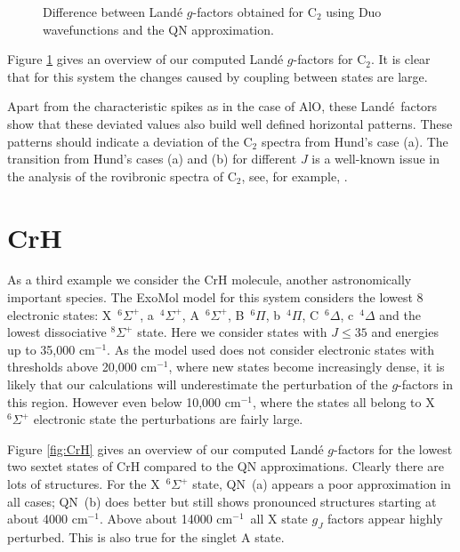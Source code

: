 \documentclass[preprint,review,12pt]{elsarticle}
\newcommand{\2}{$_{2}$}
\newcommand{\3}{$_{3}$}
\newcommand{\4}{$_{4}$}
\newcommand{\8}{$^{18}$}
\newcommand{\6}{$^{16}$}
\newcommand{\7}{$^{17}$}
\newcommand{\cm}{cm$^{-1}$}
\newcommand{\lande}{Land\'e}
\begin{document}
\begin{figure}[htbp]
		\centering
{}
\caption{Difference between Land\'e $g$-factors obtained for C$_2$ using {\sc Duo} wavefunctions and the QN
approximation.}
\label{fig:C2}
\end{figure}

	
Figure \ref{fig:C2} gives an overview of our computed Land\'e $g$-factors for
C$_2$. It is clear that for this system the changes caused by coupling
between states are large.


Apart from the characteristic spikes as in the case of AlO, these \lande\ factors show that these
deviated values also build well defined horizontal patterns. These patterns should indicate a deviation of
the C$_2$ spectra from Hund's case (a). The transition from Hund's cases (a) and (b) for different $J$ is
a well-known issue in the analysis of the rovibronic spectra of C$_2$, see, for example, \cite{94PrBe.C2}.

\section{CrH}

As a third example we consider the CrH molecule, another
astronomically important species. The ExoMol model \cite{jtCrH} for
this system considers the lowest 8 electronic states:
X~$^{6}\Sigma^+$, a~$^{4}\Sigma^+$, A~$^{6}\Sigma^+$, B~$^{6}\Pi$,
b~$^{4}\Pi$, C~$^{6}\Delta$, c~$^{4}\Delta$ and the lowest
dissociative $^8\Sigma^+$ state.  Here we consider states with $J
\leq 35$ and energies up to 35,000 \cm.
As the model used does not consider electronic states
with thresholds above 20,000 \cm,
where new states become increasingly dense,
it is likely that our calculations will underestimate the perturbation of the $g$-factors in this region. However
even below 10,000 \cm, where the states all belong to X~$^{6}\Sigma^+$ electronic state the perturbations are
fairly large.

Figure \ref{fig:CrH} gives an overview of our computed Land\'e
$g$-factors for the lowest two sextet states
of CrH compared to the QN approximations. Clearly there
are lots of structures. For the X~$^{6}\Sigma^+$ state, QN~(a) appears a poor approximation
in all cases; QN~(b) does better but still shows pronounced structures
starting at about 4000 \cm. Above about 14000 \cm\ all X state $g_J$
factors appear highly perturbed. This is also true for the singlet A state.
\end{document}
